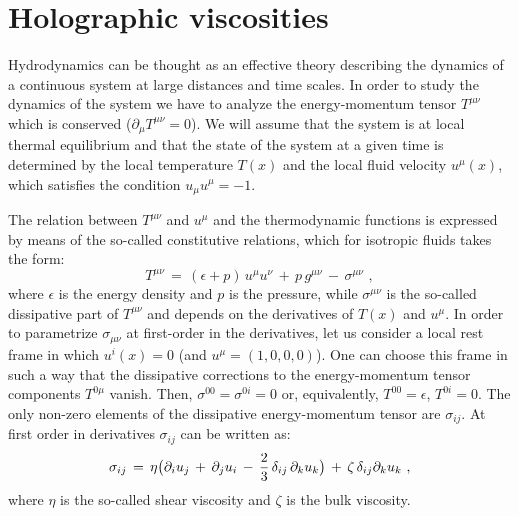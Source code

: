 \documentclass[12pt,notitlepage]{article}
\newcommand{\beq}{\begin{equation}}
\newcommand{\eeq}{\end{equation}}
\begin{document}
\section{Holographic viscosities}
Hydrodynamics can be thought as an effective theory describing the dynamics of a continuous system at large distances and time scales. In order to study the dynamics of the system we have to analyze the energy-momentum tensor $T^{\mu\nu}$ which  is conserved ($\partial_{\mu}T^{\mu\nu}=0$). We will assume that the system is at local thermal equilibrium and that the state of the system at a given time is determined by the local temperature $T(x)$ and the local fluid velocity $u^{\mu}(x)$, which satisfies the condition $u_{\mu}u^{\mu}=-1$. 

The relation between $T^{\mu\nu}$ and $u^{\mu}$ and the thermodynamic functions is expressed by means of the so-called constitutive relations, which for isotropic fluids takes the form:
\beq
T^{\mu\nu}\,=\,(\epsilon+p)\,u^{\mu} u^{\nu}\,+\,p\,g^{\mu\nu}\,-\,\sigma^{\mu\nu}\,\,,
\eeq
where $\epsilon$ is the energy density and $p$ is the pressure, while $\sigma^{\mu\nu}$ is the so-called dissipative part of $T^{\mu\nu}$ and depends on the derivatives of $T(x)$ and $u^{\mu}$.  In order to parametrize $\sigma_{\mu\nu}$ at first-order in the derivatives, let us consider a local rest frame in which $u^{i}(x)=0$ (and $u^{\mu}=(1,0,0,0)$). One can choose this frame in such a way that the dissipative corrections to the energy-momentum tensor components $T^{0\mu}$ vanish. Then, $\sigma^{00}=\sigma^{0i}=0$ or, equivalently, $T^{00}=\epsilon$,  $T^{0i}=0$. The only non-zero elements of the dissipative energy-momentum  tensor are $\sigma_{ij}$. At first order in derivatives $\sigma_{ij}$ can be written as:
\beq
\sigma_{ij}\,=\,\eta \big(\partial_{i}u_j\,+\,\partial_{j} u_i\,-\,{2\over 3}\,\delta_{ij}\,\partial_k u_k\big)\,+\,\zeta\,\delta_{ij} \partial_k u_k\,\,,
\eeq
where $\eta$ is the so-called shear viscosity and $\zeta$ is the bulk viscosity. 
\end{document}
